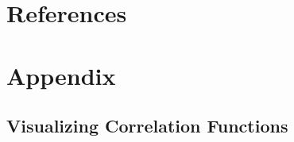 \documentclass[%
 reprint,
 amsmath,amssymb,
 aps,nofootinbib
]{revtex4-1}
\begin{document}

\onecolumngrid

\vspace{0.25 in}

\section{References}
\vspace{-.2825in}





\newpage

\section{Appendix}

\subsection{Visualizing Correlation Functions}
\end{document}
